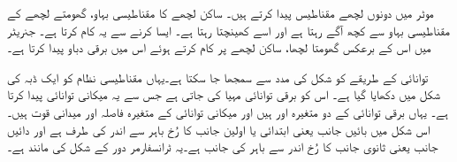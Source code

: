  موٹر میں دونوں  لچھے مقناطیس پیدا کرتے ہیں۔ ساکن لچھے کا مقناطیسی بہاو،  گھومتے لچھے کے مقناطیسی بہاو سے کچھ آگے رہتا ہے اور  اسے کھینچتا رہتا ہے۔ ایسا کرنے سے یہ کام کرتا ہے۔ جنریٹر میں اس کے برعکس  گھومتا لچھا، ساکن لچھے پر کام کرتے ہوئے اس میں برقی دباو پیدا کرتا ہے۔

توانائی کے طریقے کو شکل   کی مدد سے سمجھا جا سکتا ہے۔یہاں مقناطیسی نظام کو ایک ڈبہ کی شکل میں دکھایا گیا ہے۔ اس کو برقی توانائی مہیا کی جاتی ہے جس سے یہ میکانی توانائی پیدا کرتا ہے۔ یہاں برقی توانائی کے دو متغیرہ   اور  ہیں اور میکانی توانائی کے متغیرہ فاصلہ  اور میدانی قوت  ہیں۔ اس شکل میں بائیں جانب یعنی ابتدائی یا اولین جانب  کا رُخ باہر سے اندر کی طرف ہے اور دائیں جانب یعنی ثانوی جانب  کا رُخ اندر سے  باہر کی جانب ہے۔یہ  ٹرانسفارمر دور کے شکل   کی مانند ہے۔

